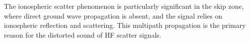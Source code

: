 The ionospheric scatter phenomenon is particularly significant in the skip zone, where direct ground wave propagation is absent, and the signal relies on ionospheric reflection and scattering. This multipath propagation is the primary reason for the distorted sound of HF scatter signals.

